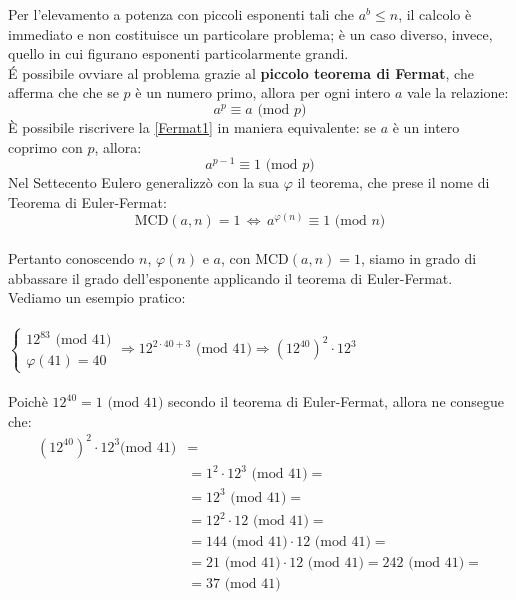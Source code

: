 \documentclass[a4paper,12pt]{article}
\begin{document}
Per l'elevamento a potenza con piccoli esponenti tali che $a^b \leq n$, il calcolo è immediato e non costituisce un particolare problema; è un caso diverso, invece, quello in cui figurano esponenti particolarmente grandi.\\
\'E possibile ovviare al problema grazie al \textbf{piccolo teorema di Fermat}, che afferma che che se $p$ è un numero primo, allora per ogni intero $a$ vale la relazione:
\begin{equation}\label{Fermat1}
    a^p \equiv a \text{ (mod $p$)}
\end{equation}
È possibile riscrivere la \eqref{Fermat1} in maniera equivalente: se $a$ è un intero coprimo con $p$, allora:
\begin{equation}\label{Fermat2}
    a^{p-1} \equiv 1 \text{ (mod $p$)}
\end{equation}
Nel Settecento Eulero generalizzò con la sua $\varphi$ il teorema, che prese il nome di Teorema di Euler-Fermat:
\begin{equation}\label{EulerFermat}
    \text{MCD$(a,n)=1$} \, \Longleftrightarrow \, a^{\varphi(n)} \equiv 1 \text{ (mod $n$)}
\end{equation}\\
Pertanto conoscendo $n$, $\varphi(n)$ e $a$, con MCD$(a,n)=1$, siamo in grado di abbassare il grado dell'esponente applicando il teorema di Euler-Fermat.\\
Vediamo un esempio pratico:\\\\
$\left \{ \begin{array}{lr}
12^{83} \text{ (mod $41$)}\\
\varphi(41)=40
\end{array}
\right. \Longrightarrow 12^{2 \cdot 40 + 3} \text{ (mod $41$)} \Longrightarrow \left(12^{40}\right)^2\cdot 12^3$ \\\\
Poichè $12^{40} = 1 \text{ (mod $41$)}$ secondo il teorema di Euler-Fermat, allora ne consegue che:
\begin{equation}
\begin{split}
\left(12^{40}\right)^2\cdot 12^3 \text{(mod $41$)} & =\\
& = 1^2 \cdot 12^3 \text{ (mod $41$)} =\\
& = 12^3 \text{ (mod $41$)} =\\
& = 12^2 \cdot 12 \text{ (mod $41$)} =\\
& = 144 \text{ (mod $41$)} \cdot 12 \text{ (mod $41$)} =\\
& = 21 \text{ (mod $41$)} \cdot 12 \text{ (mod $41$)} = 242 \text{ (mod $41$)} =\\
& = 37 \text{ (mod $41$)}
\end{split}
\end{equation}\\
\end{document}
